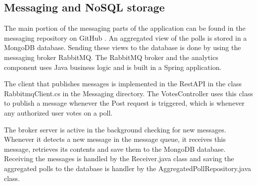 \subsection{Messaging and NoSQL storage}

The main portion of the messaging parts of the application can be found in the messaging repository on GitHub \cite{github_thorbjorn2021project-messaging_nodate}.
\newline
\newline
An aggregated view of the polls is stored in a MongoDB database. Sending these views to the database is done by using the messaging broker RabbitMQ. The RabbitMQ broker and the analytics component uses Java business logic and is built in a Spring application. 

The client that publishes messages is implemented in the RestAPI in the class RabbitmqClient.cs in the Messaging directory. The VotesController uses this class to publish a message whenever the Post request is triggered, which is whenever any authorized user votes on a poll.

The broker server is active in the background checking for new messages. Whenever it detects a new message in the message queue, it receives this message, retrieves its contents and save them to the MongoDB database. Receiving the messages is handled by the Receiver.java class and saving the aggregated polls to the database is handler by the AggregatedPollRepository.java class.